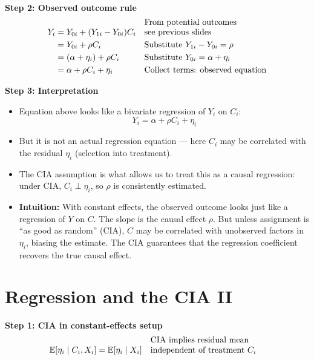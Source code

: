 \documentclass[12pt]{article}
\begin{document}
\vspace{1em}
\noindent \textbf{Step 2: Observed outcome rule}  
\begin{align}
Y_i &= Y_{0i} + (Y_{1i} - Y_{0i})C_i && \text{\shortstack[l]{From potential outcomes \\ see previous slides}} \\
    &= Y_{0i} + \rho C_i && \text{\shortstack[l]{Substitute $Y_{1i} - Y_{0i} = \rho$}} \\
    &= (\alpha + \eta_i) + \rho C_i && \text{\shortstack[l]{Substitute $Y_{0i} = \alpha + \eta_i$}} \\
    &= \alpha + \rho C_i + \eta_i && \text{\shortstack[l]{Collect terms: observed equation}}
\end{align}

\vspace{1em}
\noindent \textbf{Step 3: Interpretation}  
\begin{itemize}
    \item Equation above looks like a bivariate regression of $Y_i$ on $C_i$:  
    \[
    Y_i = \alpha + \rho C_i + \eta_i
    \]
    \item But it is not an actual regression equation — here $C_i$ may be correlated with the residual $\eta_i$ (selection into treatment).  
    \item The CIA assumption is what allows us to treat this as a causal regression: under CIA, $C_i \perp \eta_i$, so $\rho$ is consistently estimated.  
\end{itemize}

\begin{itemize}
    \item \textbf{Intuition:} With constant effects, the observed outcome looks just like a regression of $Y$ on $C$. The slope is the causal effect $\rho$. But unless assignment is “as good as random” (CIA), $C$ may be correlated with unobserved factors in $\eta_i$, biasing the estimate. The CIA guarantees that the regression coefficient recovers the true causal effect.
\end{itemize}

\section*{\noindent\textbf{Regression and the CIA II}}

\singlespacing
\noindent \textbf{Step 1: CIA in constant-effects setup}  
\begin{align}
\mathbb{E}[\eta_i \mid C_i, X_i] &= \mathbb{E}[\eta_i \mid X_i] && \text{\shortstack[l]{CIA implies residual mean \\ independent of treatment $C_i$}}
\end{align}
\end{document}
